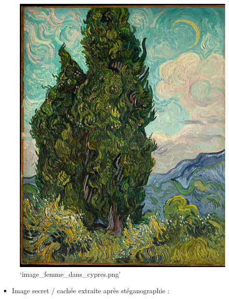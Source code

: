 \documentclass[11pt]{article}
\makeatletter
\def\maxwidth{\ifdim\Gin@nat@width>\linewidth\linewidth
    \else\Gin@nat@width\fi}
\let\Oldincludegraphics\includegraphics
\renewcommand{\includegraphics}[1]{\Oldincludegraphics[width=.8\maxwidth]{#1}}
\providecommand{\tightlist}{%
      \setlength{\itemsep}{0pt}\setlength{\parskip}{0pt}}
\makeatother
\begin{document}
\begin{figure}
\centering
\includegraphics{image_femme_dans_cypres.png}
\caption{`image\_femme\_dans\_cypres.png'}
\end{figure}

\begin{itemize}
\tightlist
\item
  Image secret / cachée extraite après stéganographie :
\end{itemize}
\end{document}

